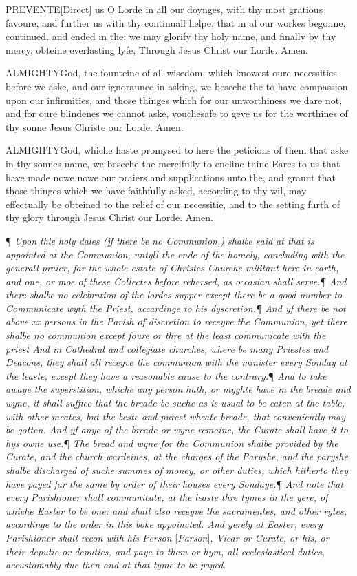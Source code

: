 PREVENTE\textbf{}[Direct] us O Lorde in all our doynges,
with thy most gratious favoure, and further us with thy continuall helpe,
that in al our workes begonne, continued, and ended in the: we may glorify
thy holy name, and finally by thy mercy, obteine everlasting lyfe, Through
Jesus Christ our Lorde. Amen.

ALMIGHTY\textbf{}God, the founteine of all wisedom, which knowest oure necessities
before we aske, and our ignoraunce in asking, we beseche the to have compassion
upon our infirmities, and those thinges which for our unworthiness we
dare not, and for oure blindenes we cannot aske, vouchesafe to geve us
for the worthines of thy sonne Jesus Christe our Lorde. Amen.

ALMIGHTY\textbf{}God, whiche haste promysed to here the peticions of them that aske
in thy sonnes name, we beseche the mercifully to encline thine Eares to
us that have made nowe nowe our praiers and supplications unto the, and
graunt that those thinges which we have faithfully asked, according to
thy wil, may effectually be obteined to the relief of our necessitie,
and to the setting furth of thy glory through Jesus Christ our Lorde.
Amen.

¶ \emph{Upon thle holy dales (jf there be no Communion,) shalbe said at
that is appointed at the Communion, untyll the ende of the homely, concluding
with the generall praier, far the whole estate of Christes Churche militant
here in earth, and one, or moe of these Collectes before rehersed, as
occasian shall serve.}¶ \emph{And
there shalbe no celebration of the lordes supper except there be a good
number to Communicate wyth the Priest, accardinge to his dyscretion.}¶ \emph{And
yf there be not above xx persons in the Parish of discretion to receyve
the Communion, yet there shalbe no communion except foure or thre at the
least communicate with the priest And in Cathedral and collegiate churches,
where be many Priestes and Deacons, they shall all receyve the communion
with the minister every Sonday at the leaste, except they have a reasonable
cause to the contrary.}¶ \emph{And
to take awaye the superstition, whiche any person hath, or myghte have
in the breade and wyne, it shall suffice that the breade be suche as is
usual to be eaten at the table, with other meates, but the beste and purest
wheate breade, that conveniently may be gotten. And yf anye of the breade
or wyne remaine, the Curate shall have it to hys owne use.}¶ \emph{The
bread and wyne for the Communion shalbe provided by the Curate, and the
church wardeines, at the charges of the Paryshe, and the paryshe shalbe
discharged of suche summes of money, or other duties, which hitherto they
have payed far the same by order of their houses every Sondaye.}¶ \emph{And
note that every Parishioner shall communicate, at the leaste thre tymes
in the yere, of whiche Easter to be one: and shall also receyve the sacramentes,
and other rytes, accordinge to the order in this boke appoincted. And
yerely at Easter, every Parishioner shall recon with his Person} [\emph{Parson}]\emph{,
Vicar or Curate, or his, or their deputie or deputies, and paye to them
or hym, all ecclesiastical duties, accustomably due then and at that tyme
to be payed.}


